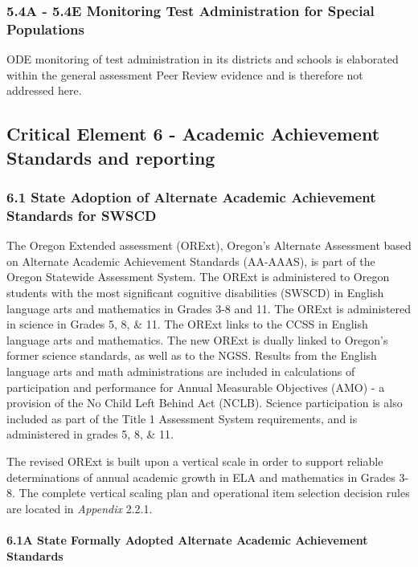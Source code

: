 \documentclass[]{article}
\let\oldparagraph\paragraph
\renewcommand{\paragraph}[1]{\oldparagraph{#1}\mbox{}}
\begin{document}
\subsubsection{5.4A - 5.4E Monitoring Test Administration for Special
Populations}\label{a---5.4e-monitoring-test-administration-for-special-populations}

ODE monitoring of test administration in its districts and schools is
elaborated within the general assessment Peer Review evidence and is
therefore not addressed here.

\subsection{Critical Element 6 - Academic Achievement Standards and
reporting}\label{critical-element-6---academic-achievement-standards-and-reporting}

\subsubsection{6.1 State Adoption of Alternate Academic Achievement
Standards for
SWSCD}\label{state-adoption-of-alternate-academic-achievement-standards-for-swscd}

The Oregon Extended assessment (ORExt), Oregon's Alternate Assessment
based on Alternate Academic Achievement Standards (AA-AAAS), is part of
the Oregon Statewide Assessment System. The ORExt is administered to
Oregon students with the most significant cognitive disabilities (SWSCD)
in English language arts and mathematics in Grades 3-8 and 11. The ORExt
is administered in science in Grades 5, 8, \& 11. The ORExt links to the
CCSS in English language arts and mathematics. The new ORExt is dually
linked to Oregon's former science standards, as well as to the NGSS.
Results from the English language arts and math administrations are
included in calculations of participation and performance for Annual
Measurable Objectives (AMO) - a provision of the No Child Left Behind
Act (NCLB). Science participation is also included as part of the Title
1 Assessment System requirements, and is administered in grades 5, 8, \&
11.

The revised ORExt is built upon a vertical scale in order to support
reliable determinations of annual academic growth in ELA and mathematics
in Grades 3-8. The complete vertical scaling plan and operational item
selection decision rules are located in \emph{Appendix} 2.2.1.

\paragraph{6.1A State Formally Adopted Alternate Academic Achievement
Standards}\label{a-state-formally-adopted-alternate-academic-achievement-standards}
\end{document}
